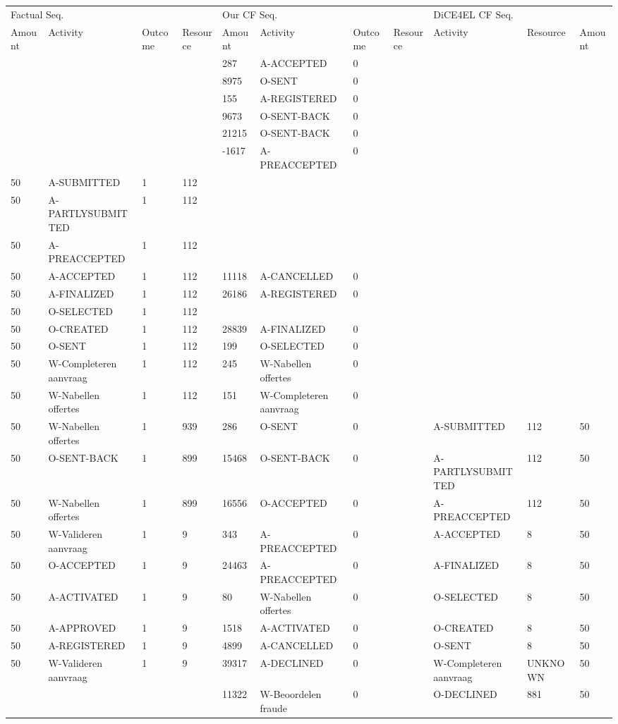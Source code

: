 \begin{tabular}{lllllllllll}
\toprule
\multicolumn{4}{l}{Factual Seq.} & \multicolumn{4}{l}{Our CF Seq.} & \multicolumn{3}{l}{DiCE4EL CF Seq.} \\
Amount & Activity & Outcome & Resource & Amount & Activity & Outcome & Resource & Activity & Resource & Amount \\
\midrule
 &  &  &  & 287 & A-ACCEPTED & 0 &  &  &  &  \\
 &  &  &  & 8975 & O-SENT & 0 &  &  &  &  \\
 &  &  &  & 155 & A-REGISTERED & 0 &  &  &  &  \\
 &  &  &  & 9673 & O-SENT-BACK & 0 &  &  &  &  \\
 &  &  &  & 21215 & O-SENT-BACK & 0 &  &  &  &  \\
 &  &  &  & -1617 & A-PREACCEPTED & 0 &  &  &  &  \\
50 & A-SUBMITTED & 1 & 112 &  &  &  &  &  &  &  \\
50 & A-PARTLYSUBMITTED & 1 & 112 &  &  &  &  &  &  &  \\
50 & A-PREACCEPTED & 1 & 112 &  &  &  &  &  &  &  \\
50 & A-ACCEPTED & 1 & 112 & 11118 & A-CANCELLED & 0 &  &  &  &  \\
50 & A-FINALIZED & 1 & 112 & 26186 & A-REGISTERED & 0 &  &  &  &  \\
50 & O-SELECTED & 1 & 112 &  &  &  &  &  &  &  \\
50 & O-CREATED & 1 & 112 & 28839 & A-FINALIZED & 0 &  &  &  &  \\
50 & O-SENT & 1 & 112 & 199 & O-SELECTED & 0 &  &  &  &  \\
50 & W-Completeren aanvraag & 1 & 112 & 245 & W-Nabellen offertes & 0 &  &  &  &  \\
50 & W-Nabellen offertes & 1 & 112 & 151 & W-Completeren aanvraag & 0 &  &  &  &  \\
50 & W-Nabellen offertes & 1 & 939 & 286 & O-SENT & 0 &  & A-SUBMITTED & 112 & 50 \\
50 & O-SENT-BACK & 1 & 899 & 15468 & O-SENT-BACK & 0 &  & A-PARTLYSUBMITTED & 112 & 50 \\
50 & W-Nabellen offertes & 1 & 899 & 16556 & O-ACCEPTED & 0 &  & A-PREACCEPTED & 112 & 50 \\
50 & W-Valideren aanvraag & 1 & 9 & 343 & A-PREACCEPTED & 0 &  & A-ACCEPTED & 8 & 50 \\
50 & O-ACCEPTED & 1 & 9 & 24463 & A-PREACCEPTED & 0 &  & A-FINALIZED & 8 & 50 \\
50 & A-ACTIVATED & 1 & 9 & 80 & W-Nabellen offertes & 0 &  & O-SELECTED & 8 & 50 \\
50 & A-APPROVED & 1 & 9 & 1518 & A-ACTIVATED & 0 &  & O-CREATED & 8 & 50 \\
50 & A-REGISTERED & 1 & 9 & 4899 & A-CANCELLED & 0 &  & O-SENT & 8 & 50 \\
50 & W-Valideren aanvraag & 1 & 9 & 39317 & A-DECLINED & 0 &  & W-Completeren aanvraag & UNKNOWN & 50 \\
 &  &  &  & 11322 & W-Beoordelen fraude & 0 &  & O-DECLINED & 881 & 50 \\
\bottomrule
\end{tabular}

